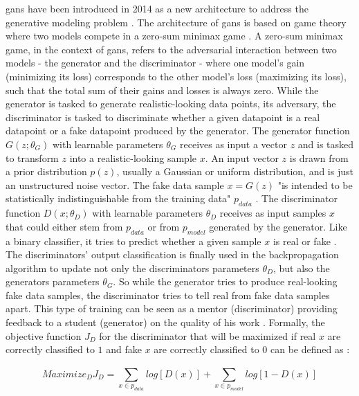 \Glspl{gan} have been introduced in 2014 as a new architecture to address the generative modeling problem \cite{NIPS2014_5ca3e9b1}.
The architecture of \glspl{gan} is based on game theory where two models compete in a zero-sum minimax game \cite{NIPS2014_5ca3e9b1, zhao2022CTABGANEnhancingTabular}.
A zero-sum minimax game, in the context of \glspl{gan}, refers to the adversarial interaction between two models - the generator and the discriminator - where one \gls{model}'s gain (minimizing its loss) corresponds to the other \gls{model}'s loss (maximizing its loss), such that the total sum of their gains and losses is always zero.
While the generator is tasked to generate realistic-looking data points, its adversary, the discriminator is tasked to discriminate whether a given datapoint is a real datapoint or a fake datapoint produced by the generator.
The generator function $G(z;\theta_G)$ with learnable parameters $\theta_G$ receives as input a vector $z$ and is tasked to transform $z$ into a realistic-looking sample $x$.
An input vector $z$ is drawn from a prior distribution $p(z)$, usually a Gaussian or uniform distribution, and is just an unstructured noise vector.
The fake data sample $x=G(z)$ "is intended to be statistically indistinguishable from the training data" $p_{data}$ \cite[p. 141]{goodfellow2020GenerativeAdversarialNetworks}.
The discriminator function $D(x;\theta_D)$ with learnable parameters $\theta_D$ receives as input samples $x$ that could either stem from $p_{data}$ or from $p_{model}$ generated by the generator.
Like a binary classifier, it tries to predict whether a given sample $x$ is real or fake \cite{NIPS2014_5ca3e9b1}.
The discriminators' output classification is finally used in the backpropagation algorithm to update not only the discriminators parameters $\theta_D$, but also the generators parameters $\theta_G$.
So while the generator tries to produce real-looking fake data samples, the discriminator tries to tell real from fake data samples apart. 
This type of training can be seen as a mentor (discriminator) providing feedback to a student (generator) on the quality of his work \cite{zhao2022CTABGANEnhancingTabular}.
Formally, the objective function $J_D$ for the discriminator that will be maximized if real $x$ are correctly classified to $1$ and fake $x$ are correctly classified to $0$ can be defined as \cite{aggarwal2018NeuralNetworksDeep}:

\begin{equation}
    \label{eqn:discriminator}
    Maximize_DJ_D= \sum_{x\in p_{data}}^{} log [D(x)] + \sum_{x\in p_{model}}^{} log [1-D(x)]
\end{equation}

